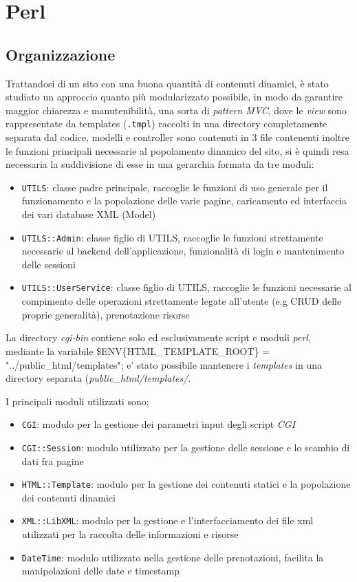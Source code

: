 \section{Perl}

\subsection{Organizzazione}

Trattandosi di un sito con una buona quantità di contenuti dinamici, è stato studiato un approccio quanto più modularizzato possibile, in modo da garantire maggior chiarezza e manutenibilità, una sorta di \textit{pattern MVC}, dove le \textit{view} sono rappresentate da templates (\texttt{.tmpl}) raccolti in una directory completamente separata dal codice, modelli e controller sono contenuti in 3 file contenenti inoltre le funzioni principali necessarie al popolamento dinamico del sito, si è quindi resa necessaria la suddivisione di esse in una gerarchia formata da tre moduli:

\begin{itemize}
  \item \texttt{UTILS}: classe padre principale, raccoglie le funzioni di uso generale per il funzionamento e la popolazione delle varie pagine, caricamento ed interfaccia dei vari database XML (Model)
  \item \texttt{UTILS::Admin}: classe figlio di UTILS, raccoglie le funzioni strettamente necessarie al backend dell'applicazione, funzionalità di login e mantenimento delle sessioni
  \item \texttt{UTILS::UserService}: classe figlio di UTILS, raccoglie le funzioni necessarie al compimento delle operazioni strettamente legate all'utente (e.g CRUD delle proprie generalità), prenotazione risorse
\end{itemize}

La directory \textit{cgi-bin} contiene solo ed esclusivamente script e moduli \textit{perl}, mediante la variabile \$ENV\{HTML\_TEMPLATE\_ROOT\} = "../public\_html/templates"; e' stato possibile mantenere i \textit{templates} in una directory separata (\textit{public\_html/templates/}.

I principali moduli utilizzati sono:

\begin{itemize}
  \item \texttt{CGI}: modulo per la gestione dei parametri input degli script \textit{CGI}
  \item \texttt{CGI::Session}: modulo utilizzato per la gestione delle sessione e lo scambio di dati fra pagine
  \item \texttt{HTML::Template}: modulo per la gestione dei contenuti statici e la popolazione dei contenuti dinamici 
  \item \texttt{XML::LibXML}: modulo per la gestione e l'interfacciamento dei file xml utilizzati per la raccolta delle informazioni e risorse
  \item \texttt{DateTime}: modulo utilizzato nella gestione delle prenotazioni, facilita la manipolazioni delle date e timestamp
\end{itemize}

